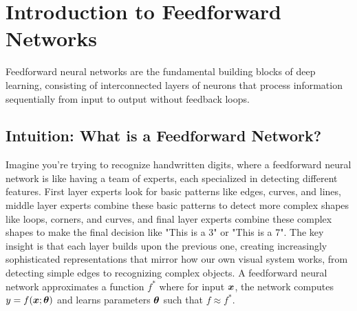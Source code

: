 
\section{Introduction to Feedforward Networks }
\label{sec:intro-feedforward}

Feedforward neural networks are the fundamental building blocks of deep learning, consisting of interconnected layers of neurons that process information sequentially from input to output without feedback loops.

\subsection{Intuition: What is a Feedforward Network?}

Imagine you're trying to recognize handwritten digits, where a feedforward neural network is like having a team of experts, each specialized in detecting different features. First layer experts look for basic patterns like edges, curves, and lines, middle layer experts combine these basic patterns to detect more complex shapes like loops, corners, and curves, and final layer experts combine these complex shapes to make the final decision like "This is a 3" or "This is a 7". The key insight is that each layer builds upon the previous one, creating increasingly sophisticated representations that mirror how our own visual system works, from detecting simple edges to recognizing complex objects. A feedforward neural network approximates a function $f^*$ where for input $\boldsymbol{x}$, the network computes $y = f(\boldsymbol{x}; \boldsymbol{\theta})$ and learns parameters $\boldsymbol{\theta}$ such that $f \approx f^*$.

